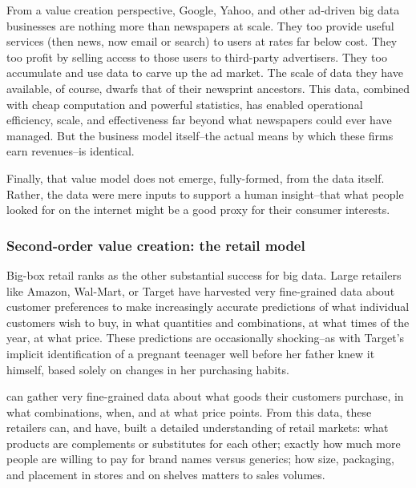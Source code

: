 \documentclass[12pt]{article}
\begin{document}
From a value creation perspective, Google, Yahoo, and other ad-driven
big data businesses are nothing more than newspapers at scale. They
too provide useful services (then news, now email or search) to users
at rates far below cost. They too profit by selling access to those
users to third-party advertisers. They too accumulate and use data to
carve up the ad market. The scale of data they have available, of
course, dwarfs that of their newsprint ancestors. This data, combined
with cheap computation and powerful statistics, has enabled
operational efficiency, scale, and effectiveness far beyond what
newspapers could ever have managed. But the business model
itself--the actual means by which these firms earn revenues--is
identical.

Finally, that value model does not emerge, fully-formed, from the data
itself. Rather, the data were mere inputs to support a human
insight--that what people looked for on the internet might be a good
proxy for their consumer interests.

\subsubsection{Second-order value creation: the retail model}
\label{sec:second-order-value}


Big-box retail ranks as the other substantial success for big
data. Large retailers like Amazon, Wal-Mart, or Target have harvested
very fine-grained data about customer preferences to make increasingly
accurate predictions of what individual customers wish to buy, in what
quantities and combinations, at what times of the year, at what
price. These predictions are occasionally shocking--as with Target's
implicit identification of a pregnant teenager well before her father
knew it himself, based solely on changes in her purchasing habits. 



can gather very
fine-grained data about what goods their customers purchase, in what
combinations, when, and at what price points. From this data, these
retailers can, and have, built a detailed understanding of retail
markets: what products are complements or substitutes for each other;
exactly how much more people are willing to pay for brand names versus
generics; how size, packaging, and placement in stores and on shelves
matters to sales volumes.
\end{document}
